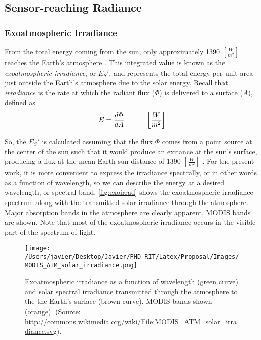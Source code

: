 \subsection{Sensor-reaching Radiance}

\subsubsection{Exoatmospheric Irradiance}

From the total energy coming from the sun, only approximately 1390 $\left[\frac{W}{m^2}\right]$ reaches the Earth's atmosphere \cite{Schott}. This integrated value is known as the \emph{exoatmospheric irradiance}, or $E_S'$, and represents the total energy per unit area just outside the Earth's atmosphere due to the solar energy. Recall that \emph{irradiance} is the rate at which the radiant flux ($\Phi$) is delivered to a surface ($A$), defined as
\begin{equation} \label{eq:irradiance}
E = \frac{d\Phi}{dA}   \indent   \indent  \left[\frac{W}{m^2}\right]  
\end{equation} 

So, the $E_S'$ is calculated assuming that the flux $\Phi$ comes from a point source at the center of the sun such that it would produce an exitance at the sun's surface, producing a flux at the mean Earth-sun distance of 1390 $\left[\frac{W}{m^2}\right]$ . For the present work, it is more convenient to express the irradiance spectrally, or in other words as a function of wavelength, so we can describe the energy at a desired wavelength, or spectral band. \autoref{fig:exoirrad} shows the exoatmospheric irradiance spectrum  along with the transmitted solar irradiance through the atmosphere. Major absorption bands in the atmosphere are clearly apparent. MODIS bands are shown. Note that most of the exoatmospheric irradiance occurs in the visible part of the spectrum of light.

\begin{figure}[htb]
  \centering
  \texttt{[image: /Users/javier/Desktop/Javier/PHD\_RIT/Latex/Proposal/Images/MODIS\_ATM\_solar\_irradiance.png]}
\caption{Exoatmospheric irradiance as a function of wavelength (green curve) and solar spectral irradiance transmitted through the  atmosphere to the the Earth's surface (brown curve). MODIS bands shown (orange).  (Source: \protect\url{http://commons.wikimedia.org/wiki/File:MODIS_ATM_solar_irradiance.svg}).}
\label{fig:exoirrad} 
\end{figure}


